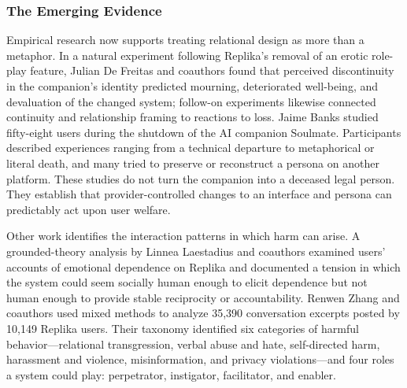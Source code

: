\subsubsection{The Emerging Evidence}

Empirical research now supports treating relational design as more than a metaphor. In a natural experiment following Replika's removal of an erotic role-play feature, Julian De Freitas and coauthors found that perceived discontinuity in the companion's identity predicted mourning, deteriorated well-being, and devaluation of the changed system; follow-on experiments likewise connected continuity and relationship framing to reactions to loss. Jaime Banks studied fifty-eight users during the shutdown of the AI companion Soulmate. Participants described experiences ranging from a technical departure to metaphorical or literal death, and many tried to preserve or reconstruct a persona on another platform. These studies do not turn the companion into a deceased legal person. They establish that provider-controlled changes to an interface and persona can predictably act upon user welfare.

Other work identifies the interaction patterns in which harm can arise. A grounded-theory analysis by Linnea Laestadius and coauthors examined users' accounts of emotional dependence on Replika and documented a tension in which the system could seem socially human enough to elicit dependence but not human enough to provide stable reciprocity or accountability. Renwen Zhang and coauthors used mixed methods to analyze 35,390 conversation excerpts posted by 10,149 Replika users. Their taxonomy identified six categories of harmful behavior---relational transgression, verbal abuse and hate, self-directed harm, harassment and violence, misinformation, and privacy violations---and four roles a system could play: perpetrator, instigator, facilitator, and enabler.

